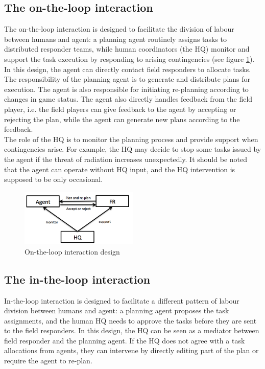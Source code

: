 \subsection{The on-the-loop interaction}
The on-the-loop interaction is designed to facilitate the division of labour between humans and agent: a planning agent routinely assigns tasks to distributed responder teams, while human coordinators (the HQ) monitor and support the task execution by responding to arising contingencies (see figure \ref{fig:OnTheLoop}). In this design, the agent can directly contact field responders to allocate tasks. The responsibility of the planning agent is to generate and distribute plans for execution. The agent is also responsible for initiating re-planning according to changes in game status. The agent also directly handles feedback from the field player, i.e. the field players can give feedback to the agent by accepting or rejecting the plan, while the agent can generate new plans according to the feedback. \\

The role of the HQ is to monitor the planning process and provide support when contingencies arise. For example, the HQ may decide to stop some tasks issued by the agent if the threat of radiation increases unexpectedly. It should be noted that the agent can operate without HQ input, and the HQ intervention is supposed to be only occasional. \\

\begin{figure}[h]
  \centering
  \includegraphics[width=0.5\textwidth]{img/approach/OnTheLoop}
  \caption{On-the-loop interaction design}
  \label{fig:OnTheLoop}
\end{figure}

\subsection{The in-the-loop interaction}
In-the-loop interaction is designed to facilitate a different pattern of labour division between humans and agent: a planning agent proposes the task assignments, and the human HQ needs to approve the tasks before they are sent to the field responders. In this design, the HQ can be seen as a mediator between field responder and the planning agent. If the HQ does not agree with a task allocations from agents, they can intervene by directly editing part of the plan or require the agent to re-plan. \\

